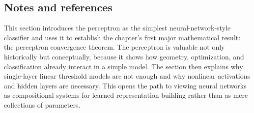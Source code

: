 \subsection*{Notes and references}

This section introduces the perceptron as the simplest neural-network-style classifier and uses it to establish the chapter's first major mathematical result: the perceptron convergence theorem. The perceptron is valuable not only historically but conceptually, because it shows how geometry, optimization, and classification already interact in a simple model. The section then explains why single-layer linear threshold models are not enough and why nonlinear activations and hidden layers are necessary. This opens the path to viewing neural networks as compositional systems for learned representation building rather than as mere collections of parameters.